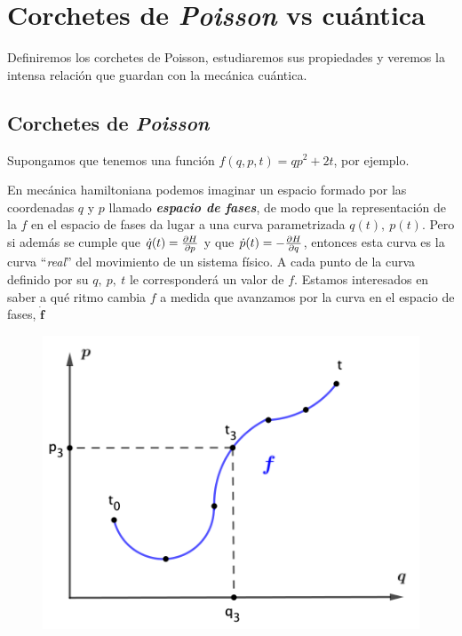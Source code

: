 \chapter{Corchetes de \emph{Poisson} vs cuántica}
\label{T20CP}



\vspace{10mm}
\begin{adjustwidth}{50pt}{50pt}
\begin{ejemplo}

Definiremos los corchetes de Poisson, estudiaremos sus propiedades y veremos la intensa relación que guardan con la mecánica cuántica.

\end{ejemplo}
\end{adjustwidth}
\vspace{5mm}
\section{Corchetes de \emph{Poisson}}
\vspace{5mm}


Supongamos que tenemos una función $f(q,p,t)=qp^2+2t$, por ejemplo.

\begin{multicols}{2}
En mecánica hamiltoniana podemos imaginar un espacio formado por las coordenadas $q$ y $p$ llamado \textbf{\emph{espacio de fases}}, de modo que la representación de la $f$ en el espacio de fases da lugar a una curva parametrizada $q(t),\ p(t)$. Pero si además se cumple que $\dot q(t)=\pdv{H}{p}$ y que $\dot p(t)=-\pdv{H}{q}$, entonces esta curva es la curva ``\emph{real}'' del movimiento de un sistema físico. A cada punto de la curva definido por su $q,\ p,\ t$ le corresponderá un valor de $f$. Estamos interesados en saber a qué ritmo cambia $f$ a medida que avanzamos por la curva en el espacio de fases, $\boldsymbol {\dot f}$

\begin{figure}[H]
	\centering
	\includegraphics[width=.4\textwidth]{imagenes/img20-01.png}
\end{figure}
\end{multicols}

